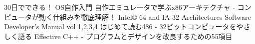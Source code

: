 \documentclass[10pt,a4j]{jsarticle}
\begin{document}
\begin{thebibliography}{99}
	 30日でできる！ OS自作入門
	 自作エミュレータで学ぶx86アーキテクチャ - コンピュータが動く仕組みを徹底理解！
	 Intel® 64 and IA-32 Architectures Software Developer’s Manual vol 1,2,3,4
	 はじめて読む486 - 32ビットコンピュータをやさしく語る
	 Effective C++ - プログラムとデザインを改良するための55項目
\end{thebibliography}
\end{document}
